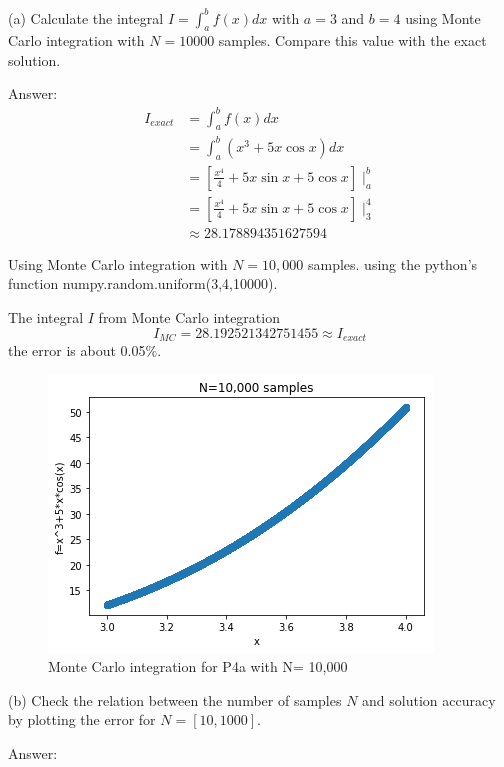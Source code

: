 \documentclass{article}
\begin{document}
(a) Calculate the integral $I = \int_{a}^{b} f(x) d x$ with $a = 3$ and $b = 4$ using Monte Carlo integration with $N = 10000$ samples. Compare this value with the exact solution.

Answer:
\begin{equation}
\begin{aligned}
I_{exact} &= \int_{a}^{b} f(x) d x \\
&= \int_{a}^{b} (x^{3} + 5x \cos{x}) d x \\
&=  \left[\frac{x^{4}}{4} +5x\sin{x}+5\cos{x}\right]\mid_{a}^{b}  \\
& = \left[\frac{x^{4}}{4} +5x\sin{x}+5\cos{x}\right]\mid_{3}^{4}\\
& \approx 28.178894351627594
\end{aligned}
\end{equation}

Using Monte Carlo integration with $N=10,000$ samples.
using the python's function numpy.random.uniform(3,4,10000).

The integral $I$ from Monte Carlo integration
\begin{equation}
I_{MC} = 28.192521342751455 \approx  I_{exact}
\end{equation}
the error is about 0.05$\%$.

\begin{figure}[ht]
\centering
\includegraphics[scale=0.6]{HW2_P4_a.png}
\caption{Monte Carlo integration for P4a with N= 10,000}
\end{figure}

(b) Check the relation between the number of samples $N$ and solution accuracy by plotting the error for $N = [10,1000]$.

Answer:
\end{document}
